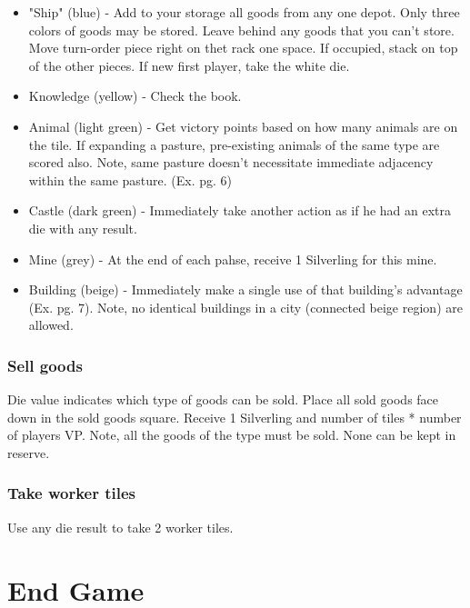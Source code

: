 \documentclass[12pt]{article}
\newenvironment{itemizeCustom}
{\begin{itemize}
  \setlength{\itemsep}{1pt}
  \setlength{\parskip}{0pt}
  \setlength{\parsep}{0pt}}
{\end{itemize}}
\begin{document}
\begin{multicols*}{2}
\begin{itemizeCustom}
	\item "Ship" (blue) - Add to your storage all goods from any one depot. Only three colors of goods may be stored. Leave behind any goods that you can't store. Move turn-order piece right on thet rack one space. If occupied, stack on top of the other pieces. If new first player, take the white die.
	\item Knowledge (yellow) - Check the book.
	\item Animal (light green) - Get victory points based on how many animals are on the tile. If expanding a pasture, pre-existing animals of the same type are scored also. Note, same pasture doesn't necessitate immediate adjacency within the same pasture. (Ex. pg. 6)
	\item Castle (dark green) - Immediately take another action as if he had an extra die with any result.
	\item Mine (grey) - At the end of each pahse, receive 1 Silverling for this mine.
	\item Building (beige) - Immediately make a single use of that building's advantage (Ex. pg. 7). Note, no identical buildings in a city (connected beige region) are allowed.
\end{itemizeCustom}

\subsubsection*{Sell goods}
Die value indicates which type of goods can be sold. Place all sold goods face down in the sold goods square. Receive 1 Silverling and number of tiles * number of players VP. Note, all the goods of the type must be sold. None can be kept in reserve.

\subsubsection*{Take worker tiles}
Use any die result to take 2 worker tiles.

\section*{End Game}

\end{multicols*}
\end{document}
